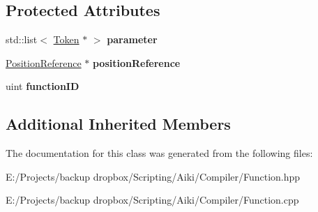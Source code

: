 \subsection*{Protected Attributes}
\begin{DoxyCompactItemize}
\item 
\hypertarget{a00010_a60ebd403b26d523eff61d2a64fb27844}{std\+::list$<$ \hyperlink{a00025}{Token} $\ast$ $>$ {\bfseries parameter}}\label{a00010_a60ebd403b26d523eff61d2a64fb27844}

\item 
\hypertarget{a00010_a47075e621f8a25d995dc9cf8a0a116fe}{\hyperlink{a00019}{Position\+Reference} $\ast$ {\bfseries position\+Reference}}\label{a00010_a47075e621f8a25d995dc9cf8a0a116fe}

\item 
\hypertarget{a00010_a575ea1e569ce84b127ca0a7a8e0a6d00}{uint {\bfseries function\+I\+D}}\label{a00010_a575ea1e569ce84b127ca0a7a8e0a6d00}

\end{DoxyCompactItemize}
\subsection*{Additional Inherited Members}


The documentation for this class was generated from the following files\+:\begin{DoxyCompactItemize}
\item 
E\+:/\+Projects/backup dropbox/\+Scripting/\+Aiki/\+Compiler/Function.\+hpp\item 
E\+:/\+Projects/backup dropbox/\+Scripting/\+Aiki/\+Compiler/Function.\+cpp\end{DoxyCompactItemize}
